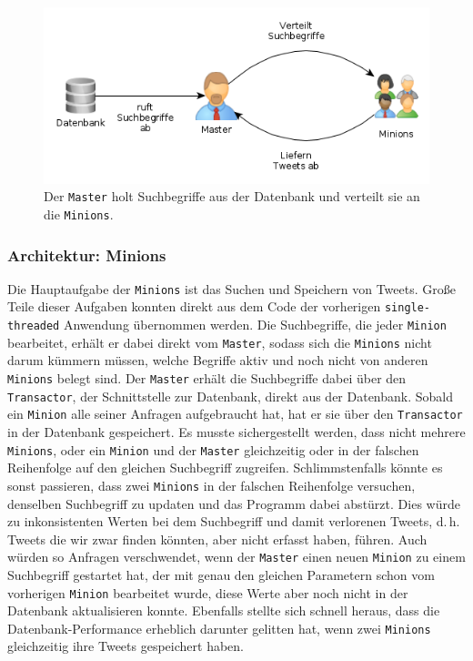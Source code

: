 \begin{figure}[ht]
\includegraphics[width=\textwidth]{Bilder/Daemon/DaemonArchitektur1.png}
\caption{Der \texttt{Master} holt Suchbegriffe aus der Datenbank und verteilt sie an die \texttt{Minions}.}
\label{img:daemonarchitektur1}
\end{figure}

\subsubsection{Architektur: Minions} %
Die Hauptaufgabe der \texttt{Minions} ist das Suchen und Speichern von Tweets.
Große Teile dieser Aufgaben konnten direkt aus dem Code der vorherigen \texttt{single-threaded} Anwendung übernommen werden.
Die Suchbegriffe, die jeder \texttt{Minion} bearbeitet, erhält er dabei direkt vom \texttt{Master}, sodass sich die \texttt{Minions} nicht darum kümmern müssen, welche Begriffe aktiv und noch nicht von anderen \texttt{Minions} belegt sind.
Der \texttt{Master} erhält die Suchbegriffe dabei über den \texttt{Transactor}, der Schnittstelle zur Datenbank, direkt aus der Datenbank.
Sobald ein \texttt{Minion} alle seiner Anfragen aufgebraucht hat, hat er sie über den \texttt{Transactor} in der Datenbank gespeichert.
Es musste sichergestellt werden, dass nicht mehrere \texttt{Minions}, oder ein \texttt{Minion} und der \texttt{Master} gleichzeitig oder in der falschen Reihenfolge auf den gleichen Suchbegriff zugreifen.
Schlimmstenfalls könnte es sonst passieren, dass zwei \texttt{Minions} in der falschen Reihenfolge versuchen, denselben Suchbegriff zu updaten und das Programm dabei abstürzt.
Dies würde zu inkonsistenten Werten bei dem Suchbegriff und damit verlorenen Tweets, d.\,h. Tweets die wir zwar finden könnten, aber nicht erfasst haben, führen.
Auch würden so Anfragen verschwendet, wenn der \texttt{Master} einen neuen \texttt{Minion} zu einem Suchbegriff gestartet hat, der mit genau den gleichen Parametern schon vom vorherigen \texttt{Minion} bearbeitet wurde, diese Werte aber noch nicht in der Datenbank aktualisieren konnte.
Ebenfalls stellte sich schnell heraus, dass die Datenbank-Performance erheblich darunter gelitten hat, wenn zwei \texttt{Minions} gleichzeitig ihre Tweets gespeichert haben.


